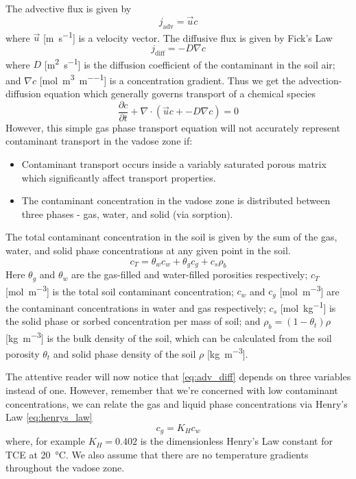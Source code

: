 The advective flux is given by
\begin{equation}
  j_\mathrm{adv} = \vec{u} c
\end{equation}
where $\vec{u}$ [\si{\metre\per\second}] is a velocity vector.
The diffusive flux is given by Fick's Law
\begin{equation}
  j_\mathrm{diff} = -D \nabla c
\end{equation}
where $D$ [\si{\metre\squared\per\second}] is the diffusion coefficient of the contaminant in the soil air;
and $\nabla c$ [\si{\mol\per\metre\cubed\per\metre}] is a concentration gradient.
Thus we get the advection-diffusion equation which generally governs transport of a chemical species
\begin{equation}\label{eq:adv_diff}
  \frac{\partial c}{\partial t} + \nabla \cdot(\vec{u} c + -D \nabla c) = 0
\end{equation}
However, this simple gas phase transport equation will not accurately represent contaminant transport in the vadose zone if:
\begin{itemize}
  \item Contaminant transport occurs inside a variably saturated porous matrix which significantly affect transport properties.
  \item The contaminant concentration in the vadose zone is distributed between three phases - gas, water, and solid (via sorption).
\end{itemize}\par

The total contaminant concentration in the soil is given by the sum of the gas, water, and solid phase concentrations at any given point in the soil.
\begin{equation}
  c_T = \theta_w c_w + \theta_g c_g + c_s \rho_b
\end{equation}
Here $\theta_g$ and $\theta_w$ are the gas-filled and water-filled porosities respectively;
$c_T$ [\si{\mol\per\metre\cubed}] is the total soil contaminant concentration;
$c_w$ and $c_g$ [\si{\mol\per\metre\cubed}] are the contaminant concentrations in water and gas respectively;
$c_s$ [\si{\mol\per\kilogram}] is the solid phase or sorbed concentration per mass of soil;
and $\rho_b = (1-\theta_t) \rho$ [\si{\kilogram\per\metre\cubed}] is the bulk density of the soil, which can be calculated from the soil porosity $\theta_t$ and solid phase density of the soil $\rho$ [\si{\kilogram\per\metre\cubed}].\par

The attentive reader will now notice that \eqref{eq:adv_diff} depends on three variables instead of one.
However, remember that we're concerned with low contaminant concentrations, we can relate the gas and liquid phase concentrations via Henry's Law \eqref{eq:henrys_law}
\begin{equation}\label{eq:henrys_law}
  c_g = K_H c_w
\end{equation}
where, for example $K_H = 0.402$ is the dimensionless Henry's Law constant for TCE at \SI{20}{\degreeCelsius}\cite{heron_henrys_1998}.
We also assume that there are no temperature gradients throughout the vadose zone.\par

